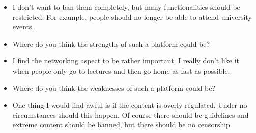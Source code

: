 {\begin{itemize}[]
    \item {} I don't want to ban them completely, but many functionalities should be restricted. For example, people should no longer be able to attend university events. 
    \item {} Where do you think the strengths of such a platform could be?
    \item {} I find the networking aspect to be rather important. I really don't like it when people only go to lectures and then go home as fast as possible.
    \item {} Where do you think the weaknesses of such a platform could be?
    \item {} One thing I would find awful is if the content is overly regulated. Under no circumstances should this happen. Of course there should be guidelines and extreme content should be banned, but there should be no censorship.
\end{itemize}}
\nolinenumbers
